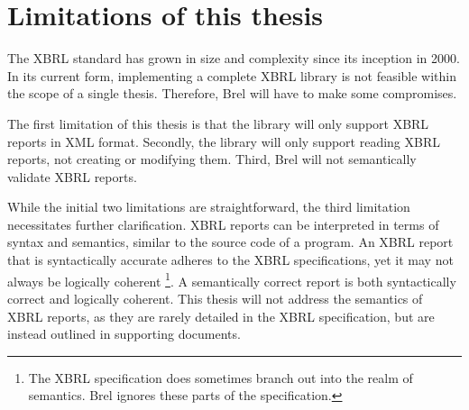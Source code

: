 \section{Limitations of this thesis}
\label{sec:limitations}

The XBRL standard has grown in size and complexity since its inception in 2000.
In its current form, implementing a complete XBRL library is not feasible within the scope of a single thesis.
Therefore, Brel will have to make some compromises.

The first limitation of this thesis is that the library will only support XBRL reports in XML format.
Secondly, the library will only support reading XBRL reports, not creating or modifying them.
Third, Brel will not semantically validate XBRL reports.

While the initial two limitations are straightforward, the third limitation necessitates further clarification.
XBRL reports can be interpreted in terms of syntax and semantics, similar to the source code of a program.
An XBRL report that is syntactically accurate adheres to the XBRL specifications, yet it may not always be logically coherent
\footnote{The XBRL specification does sometimes branch out into the realm of semantics. Brel ignores these parts of the specification.}.
A semantically correct report is both syntactically correct and logically coherent.
This thesis will not address the semantics of XBRL reports, 
as they are rarely detailed in the XBRL specification,
but are instead outlined in supporting documents.

